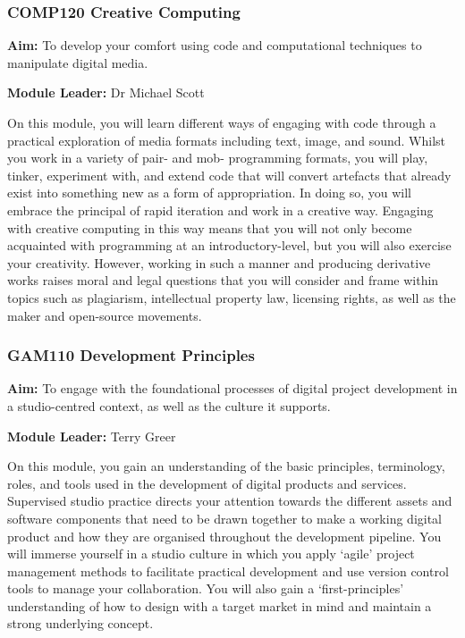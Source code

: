 \begin{frame}
	\frametitle{COMP120 Creative Computing}
		
	\small{\textbf{Aim:} To develop your comfort using code and computational techniques to manipulate digital media.}
	
	\vspace{0.5em}
	
	\small{\textbf{Module Leader:} Dr Michael Scott}	
	
		\vspace{0.5em}
	
\footnotesize{On this module, you will learn different ways of engaging with code through a practical exploration of media formats including text, image, and sound. Whilst you work in a variety of pair- and mob- programming formats, you will play, tinker, experiment with, and extend code that will convert artefacts that already exist into something new as a form of appropriation.  In doing so, you will embrace the principal of rapid iteration and work in a creative way.  Engaging with creative computing in this way means that you will not only become acquainted with programming at an introductory-level, but you will also exercise your creativity. However, working in such a manner and producing derivative works raises moral and legal questions that you will consider and frame within topics such as plagiarism, intellectual property law, licensing rights, as well as the maker and open-source movements.}
	
\end{frame}

\begin{frame}
	\frametitle{GAM110 Development Principles}
		
	\small{\textbf{Aim:} To engage with the foundational processes of digital project development in a studio-centred context, as well as the culture it supports.}
	
	\vspace{0.5em}
	
	\small{\textbf{Module Leader:} Terry Greer}
	
	\vspace{0.5em}
	
\footnotesize{On this module, you gain an understanding of the basic principles, terminology, roles, and tools used in the development of digital products and services. Supervised studio practice directs your attention towards the different assets and software components that need to be drawn together to make a working digital product and how they are organised throughout the development pipeline. You will immerse yourself in a studio culture in which you apply ‘agile’ project management methods to facilitate practical development and use version control tools to manage your collaboration. You will also gain a ‘first-principles’ understanding of how to design with a target market in mind and maintain a strong underlying concept.}
	
\end{frame}

